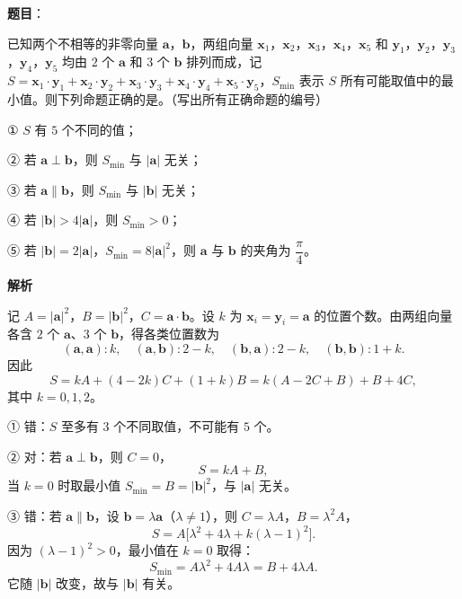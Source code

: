\begin{answer}

\textbf{题目}：

已知两个不相等的非零向量 $\boldsymbol a$，$\boldsymbol b$，两组向量 $\boldsymbol x_1$，$\boldsymbol x_2$，$\boldsymbol x_3$，$\boldsymbol x_4$，$\boldsymbol x_5$ 和 $\boldsymbol y_1$，$\boldsymbol y_2$，$\boldsymbol y_3$，$\boldsymbol y_4$，$\boldsymbol y_5$ 均由 $2$ 个 $\boldsymbol a$ 和 $3$ 个 $\boldsymbol b$ 排列而成，记 $S=\boldsymbol x_1\cdot\boldsymbol y_1+\boldsymbol x_2\cdot\boldsymbol y_2+\boldsymbol x_3\cdot\boldsymbol y_3+\boldsymbol x_4\cdot\boldsymbol y_4+\boldsymbol x_5\cdot\boldsymbol y_5$，$S_{\min}$ 表示 $S$ 所有可能取值中的最小值。则下列命题正确的是\gkblank{}。（写出所有正确命题的编号）

① $S$ 有 $5$ 个不同的值；

② 若 $\boldsymbol a\perp\boldsymbol b$，则 $S_{\min}$ 与 $|\boldsymbol a|$ 无关；

③ 若 $\boldsymbol a\parallel\boldsymbol b$，则 $S_{\min}$ 与 $|\boldsymbol b|$ 无关；

④ 若 $|\boldsymbol b|>4|\boldsymbol a|$，则 $S_{\min}>0$；

⑤ 若 $|\boldsymbol b|=2|\boldsymbol a|$，$S_{\min}=8|\boldsymbol a|^2$，则 $\boldsymbol a$ 与 $\boldsymbol b$ 的夹角为 $\dfrac\pi4$。

\textbf{解析}

记 $A=|\boldsymbol a|^2$，$B=|\boldsymbol b|^2$，$C=\boldsymbol a\cdot\boldsymbol b$。设 $k$ 为 $\boldsymbol x_i=\boldsymbol y_i=\boldsymbol a$ 的位置个数。由两组向量各含 $2$ 个 $\boldsymbol a$、$3$ 个 $\boldsymbol b$，得各类位置数为
\nopagebreak[4]
\[(\boldsymbol a,\boldsymbol a):k,\quad (\boldsymbol a,\boldsymbol b):2-k,\quad
(\boldsymbol b,\boldsymbol a):2-k,\quad (\boldsymbol b,\boldsymbol b):1+k .\]
因此
\nopagebreak[4]
\[S=kA+(4-2k)C+(1+k)B=k(A-2C+B)+B+4C,\]
其中 $k=0,1,2$。

① 错：$S$ 至多有 $3$ 个不同取值，不可能有 $5$ 个。

② 对：若 $\boldsymbol a\perp\boldsymbol b$，则 $C=0$，
\nopagebreak[4]
\[S=kA+B,\]
当 $k=0$ 时取最小值 $S_{\min}=B=|\boldsymbol b|^2$，与 $|\boldsymbol a|$ 无关。

③ 错：若 $\boldsymbol a\parallel\boldsymbol b$，设 $\boldsymbol b=\lambda\boldsymbol a$（$\lambda\neq1$），则 $C=\lambda A$，$B=\lambda^2A$，
\nopagebreak[4]
\[S=A\bigl[\lambda^2+4\lambda+k(\lambda-1)^2\bigr].\]
因为 $(\lambda-1)^2>0$，最小值在 $k=0$ 取得：
\nopagebreak[4]
\[S_{\min}=A\lambda^2+4A\lambda=B+4\lambda A .\]
它随 $|\boldsymbol b|$ 改变，故与 $|\boldsymbol b|$ 有关。


\end{answer}
